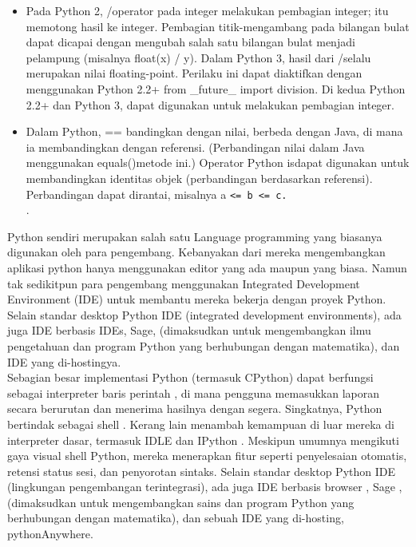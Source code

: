 \begin{itemize}	
\item Pada Python 2, /operator pada integer melakukan pembagian integer; itu memotong hasil ke integer. Pembagian titik-mengambang pada bilangan bulat dapat dicapai dengan mengubah salah satu bilangan bulat menjadi pelampung (misalnya float(x) / y). Dalam Python 3, hasil dari /selalu merupakan nilai floating-point. Perilaku ini dapat diaktifkan dengan menggunakan Python 2.2+ from \_future\_ import division. Di kedua Python 2.2+ dan Python 3, dapat digunakan untuk melakukan pembagian integer.\\
\item Dalam Python, == bandingkan dengan nilai, berbeda dengan Java, di mana ia membandingkan dengan referensi. (Perbandingan nilai dalam Java menggunakan equals()metode ini.) Operator Python isdapat digunakan untuk membandingkan identitas objek (perbandingan berdasarkan referensi). Perbandingan dapat dirantai, misalnya a \verb|<= b <= c.|\\ \cite{van2007python}.\\
\end{itemize}

	Python sendiri merupakan salah satu Language programming yang biasanya digunakan oleh para pengembang. Kebanyakan dari mereka mengembangkan aplikasi python hanya menggunakan editor yang ada maupun yang biasa. Namun tak sedikitpun para pengembang menggunakan Integrated Development Environment (IDE) untuk membantu mereka bekerja dengan proyek Python. Selain standar desktop Python IDE (integrated development environments), ada juga IDE berbasis IDEs, Sage, (dimaksudkan untuk mengembangkan ilmu pengetahuan dan program Python yang berhubungan dengan matematika), dan IDE yang di-hostingya.\\
	
	Sebagian besar implementasi Python (termasuk CPython) dapat berfungsi sebagai interpreter baris perintah , di mana pengguna memasukkan laporan secara berurutan dan menerima hasilnya dengan segera. Singkatnya, Python bertindak sebagai shell . Kerang lain menambah kemampuan di luar mereka di interpreter dasar, termasuk IDLE dan IPython . Meskipun umumnya mengikuti gaya visual shell Python, mereka menerapkan fitur seperti penyelesaian otomatis, retensi status sesi, dan penyorotan sintaks. Selain standar desktop Python IDE (lingkungan pengembangan terintegrasi), ada juga IDE berbasis browser , Sage , (dimaksudkan untuk mengembangkan sains dan program Python yang berhubungan dengan matematika), dan sebuah IDE yang di-hosting, pythonAnywhere. \cite{van2007python} \\

